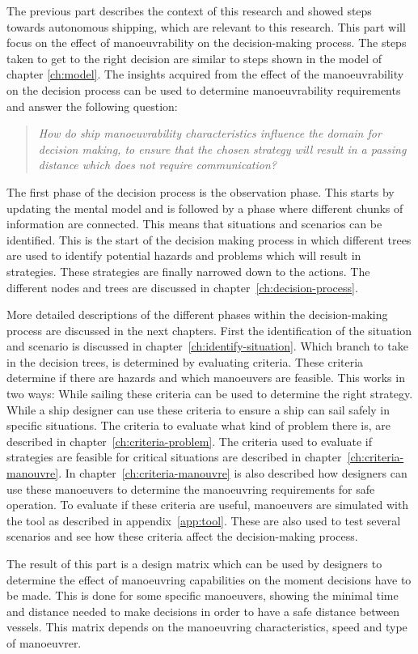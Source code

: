 The previous part describes the context of this research and showed steps towards autonomous shipping, which are relevant to this research. This part will focus on the effect of manoeuvrability on the decision-making process. The steps taken to get to the right decision are similar to steps shown in the model of chapter \ref{ch:model}. The insights acquired from the effect of the manoeuvrability on the decision process can be used to determine manoeuvrability requirements and answer the following question:

\begin{quotation}
	\emph{How do ship manoeuvrability characteristics influence the domain for decision making, to ensure that the chosen strategy will result in a passing distance which does not require communication?} 
\end{quotation}

The first phase of the decision process is the observation phase. This starts by updating the mental model and is followed by a phase where different chunks of information are connected. This means that situations and scenarios can be identified. This is the start of the decision making process in which different trees are used to identify potential hazards and problems which will result in strategies. These strategies are finally narrowed down to the actions. The different nodes and trees are discussed in chapter~\ref{ch:decision-process}. 

More detailed descriptions of the different phases within the decision-making process are discussed in the next chapters. First the identification of the situation and scenario is discussed in chapter~\ref{ch:identify-situation}.
Which branch to take in the decision trees, is determined by evaluating criteria. These criteria determine if there are hazards and which manoeuvers are feasible. This works in two ways: While sailing these criteria can be used to determine the right strategy. While a ship designer can use these criteria to ensure a ship can sail safely in specific situations. The criteria to evaluate what kind of problem there is, are described in chapter~\ref{ch:criteria-problem}. The criteria used to evaluate if strategies are feasible for critical situations are described in chapter~\ref{ch:criteria-manouvre}. In chapter~\ref{ch:criteria-manouvre} is also described how designers can use these manoeuvers to determine the manoeuvring requirements for safe operation. To evaluate if these criteria are useful, manoeuvers are simulated with the tool as described in appendix~\ref{app:tool}. These are also used to test several scenarios and see how these criteria affect the decision-making process.

The result of this part is a design matrix which can be used by designers to determine the effect of manoeuvring capabilities on the moment decisions have to be made. This is done for some specific manoeuvers, showing the minimal time and distance needed to make decisions in order to have a safe distance between vessels. This matrix depends on the manoeuvring characteristics, speed and type of manoeuvrer.